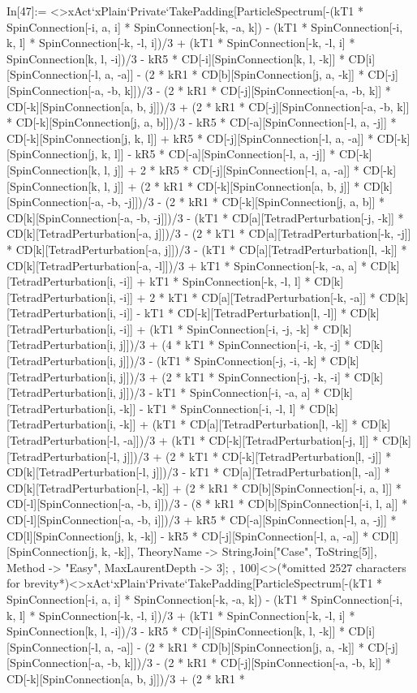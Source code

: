 In[47]:= <>xAct`xPlain`Private`TakePadding[ParticleSpectrum[-(kT1 * SpinConnection[-i, a, i] * SpinConnection[-k, -a, k]) - (kT1 * SpinConnection[-i, k, l] * SpinConnection[-k, -l, i])/3 + (kT1 * SpinConnection[-k, -l, i] * SpinConnection[k, l, -i])/3 - kR5 * CD[-i][SpinConnection[k, l, -k]] * CD[i][SpinConnection[-l, a, -a]] - (2 * kR1 * CD[b][SpinConnection[j, a, -k]] * CD[-j][SpinConnection[-a, -b, k]])/3 - (2 * kR1 * CD[-j][SpinConnection[-a, -b, k]] * CD[-k][SpinConnection[a, b, j]])/3 + (2 * kR1 * CD[-j][SpinConnection[-a, -b, k]] * CD[-k][SpinConnection[j, a, b]])/3 - kR5 * CD[-a][SpinConnection[-l, a, -j]] * CD[-k][SpinConnection[j, k, l]] + kR5 * CD[-j][SpinConnection[-l, a, -a]] * CD[-k][SpinConnection[j, k, l]] - kR5 * CD[-a][SpinConnection[-l, a, -j]] * CD[-k][SpinConnection[k, l, j]] + 2 * kR5 * CD[-j][SpinConnection[-l, a, -a]] * CD[-k][SpinConnection[k, l, j]] + (2 * kR1 * CD[-k][SpinConnection[a, b, j]] * CD[k][SpinConnection[-a, -b, -j]])/3 - (2 * kR1 * CD[-k][SpinConnection[j, a, b]] * CD[k][SpinConnection[-a, -b, -j]])/3 - (kT1 * CD[a][TetradPerturbation[-j, -k]] * CD[k][TetradPerturbation[-a, j]])/3 - (2 * kT1 * CD[a][TetradPerturbation[-k, -j]] * CD[k][TetradPerturbation[-a, j]])/3 - (kT1 * CD[a][TetradPerturbation[l, -k]] * CD[k][TetradPerturbation[-a, -l]])/3 + kT1 * SpinConnection[-k, -a, a] * CD[k][TetradPerturbation[i, -i]] + kT1 * SpinConnection[-k, -l, l] * CD[k][TetradPerturbation[i, -i]] + 2 * kT1 * CD[a][TetradPerturbation[-k, -a]] * CD[k][TetradPerturbation[i, -i]] - kT1 * CD[-k][TetradPerturbation[l, -l]] * CD[k][TetradPerturbation[i, -i]] + (kT1 * SpinConnection[-i, -j, -k] * CD[k][TetradPerturbation[i, j]])/3 + (4 * kT1 * SpinConnection[-i, -k, -j] * CD[k][TetradPerturbation[i, j]])/3 - (kT1 * SpinConnection[-j, -i, -k] * CD[k][TetradPerturbation[i, j]])/3 + (2 * kT1 * SpinConnection[-j, -k, -i] * CD[k][TetradPerturbation[i, j]])/3 - kT1 * SpinConnection[-i, -a, a] * CD[k][TetradPerturbation[i, -k]] - kT1 * SpinConnection[-i, -l, l] * CD[k][TetradPerturbation[i, -k]] + (kT1 * CD[a][TetradPerturbation[l, -k]] * CD[k][TetradPerturbation[-l, -a]])/3 + (kT1 * CD[-k][TetradPerturbation[-j, l]] * CD[k][TetradPerturbation[-l, j]])/3 + (2 * kT1 * CD[-k][TetradPerturbation[l, -j]] * CD[k][TetradPerturbation[-l, j]])/3 - kT1 * CD[a][TetradPerturbation[l, -a]] * CD[k][TetradPerturbation[-l, -k]] + (2 * kR1 * CD[b][SpinConnection[-i, a, l]] * CD[-l][SpinConnection[-a, -b, i]])/3 - (8 * kR1 * CD[b][SpinConnection[-i, l, a]] * CD[-l][SpinConnection[-a, -b, i]])/3 + kR5 * CD[-a][SpinConnection[-l, a, -j]] * CD[l][SpinConnection[j, k, -k]] - kR5 * CD[-j][SpinConnection[-l, a, -a]] * CD[l][SpinConnection[j, k, -k]], TheoryName -> StringJoin["Case", ToString[5]], Method -> "Easy", MaxLaurentDepth -> 3]; , 100]<>(*omitted 2527 characters for brevity*)<>xAct`xPlain`Private`TakePadding[ParticleSpectrum[-(kT1 * SpinConnection[-i, a, i] * SpinConnection[-k, -a, k]) - (kT1 * SpinConnection[-i, k, l] * SpinConnection[-k, -l, i])/3 + (kT1 * SpinConnection[-k, -l, i] * SpinConnection[k, l, -i])/3 - kR5 * CD[-i][SpinConnection[k, l, -k]] * CD[i][SpinConnection[-l, a, -a]] - (2 * kR1 * CD[b][SpinConnection[j, a, -k]] * CD[-j][SpinConnection[-a, -b, k]])/3 - (2 * kR1 * CD[-j][SpinConnection[-a, -b, k]] * CD[-k][SpinConnection[a, b, j]])/3 + (2 * kR1 * 